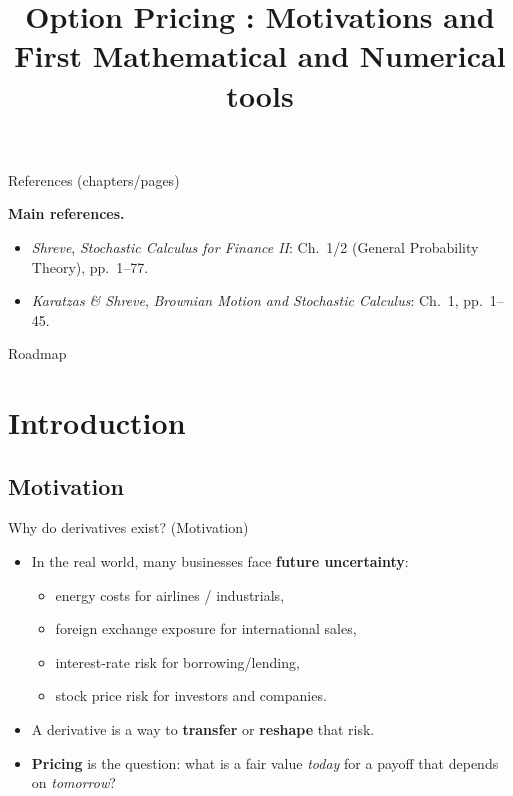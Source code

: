 \documentclass[10pt,aspectratio=169]{beamer}
\title{Option Pricing : Motivations and First Mathematical and Numerical tools}
\author{}
\date{}
\begin{document}
\begin{frame}[plain]
  \titlepage
\end{frame}

\begin{frame}{References (chapters/pages)}

\footnotesize
\textbf{Main references.}

\begin{itemize}\setlength{\itemsep}{0.35em}
  \item \textit{Shreve}, \emph{Stochastic Calculus for Finance II}:
  Ch.~1/2 (General Probability Theory), pp.~1--77.
  \item \textit{Karatzas \& Shreve}, \emph{Brownian Motion and Stochastic Calculus}:
  Ch.~1, pp.~1--45.
\end{itemize}

\end{frame}

\begin{frame}{Roadmap}
  \tableofcontents[hideallsubsections]
\end{frame}

\section{Introduction}

\subsection{Motivation}
\begin{frame}{Why do derivatives exist? (Motivation)}
\begin{itemize}
  \item In the real world, many businesses face \textbf{future uncertainty}:\pause
  \begin{itemize}
    \item energy costs for airlines / industrials,\pause
    \item foreign exchange exposure for international sales,\pause
    \item interest-rate risk for borrowing/lending,\pause
    \item stock price risk for investors and companies.\pause
  \end{itemize}
  \item A derivative is a way to \textbf{transfer} or \textbf{reshape} that risk.\pause
  \item \textbf{Pricing} is the question: what is a fair value \emph{today} for a payoff that depends on \emph{tomorrow}?
\end{itemize}
\end{frame}
\end{document}
